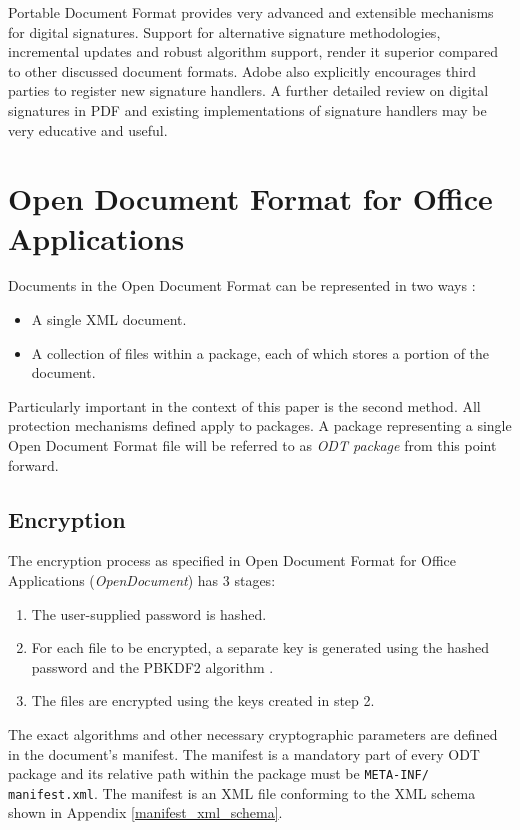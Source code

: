 \documentclass[11pt,oneside]{fithesis2}
\begin{document}
Portable Document Format provides very advanced and extensible mechanisms for digital signatures. Support for alternative signature methodologies, incremental updates and robust algorithm support, render it superior compared to other discussed document formats. Adobe also explicitly encourages third parties to register new signature handlers. A further detailed review on digital signatures in PDF and existing implementations of signature handlers may be very educative and useful.  

\chapter{Open Document Format for Office Applications}\label{ch_odt}

Documents in the Open Document Format can be represented in two ways \cite{odt_spec}:

\begin{itemize}
\setlength\itemsep{0.1em}
\item{A single XML document.}
\item{A collection of files within a package, each of which stores a portion of the document.}
\end{itemize}

Particularly important in the context of this paper is the second method. All protection mechanisms defined apply to packages. A package representing a single Open Document Format file will be referred to as \textit{ODT package} from this point forward.

\section{Encryption}\label{odt_enc}

The encryption process as specified in Open Document Format for Office Applications (\textit{OpenDocument}) \cite{odt_spec} has 3 stages:

\begin{enumerate}\label{encrypt_process_odt}
\setlength\itemsep{0.1em}
	\item{The user-supplied password is hashed.}
	\item{For each file to be encrypted, a separate key is generated using the hashed password and the PBKDF2 algorithm \cite{rfc2898}.}
	\item{The files are encrypted using the keys created in step 2.}
\end{enumerate}

The exact algorithms and other necessary cryptographic parameters are defined in the document's manifest. The manifest is a mandatory part of every ODT package and its relative path within the package must be \texttt{META-INF/}
\texttt{manifest.xml}. The manifest is an XML file conforming to the XML schema shown in Appendix \ref{manifest_xml_schema}.
\end{document}
